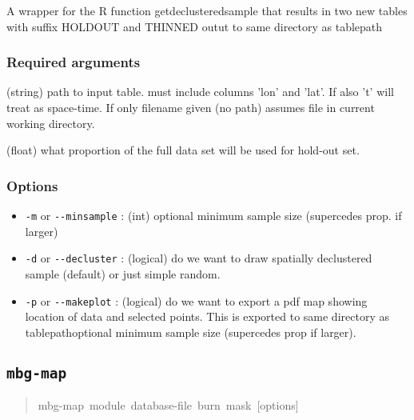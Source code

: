 A wrapper for the R function getdeclusteredsample that results in two new tables with
suffix HOLDOUT and THINNED outut to same directory as tablepath




\subsubsection{Required arguments%
}
\setcounter{listcnt0}{0}
\begin{list}{.}
{
\setlength{\rightmargin}{\leftmargin}
}

\item (string) path to input table. must include columns 'lon' and 'lat'. If
also 't' will treat as space-time. If only filename given (no path) assumes file
in current working directory.

\item (float) what proportion of the full data set will be used for hold-out set.
\end{list}




\subsubsection{Options%
}
%
\begin{itemize}

\item \texttt{-m} or \texttt{-{}-minsample} : (int) optional minimum sample size (supercedes prop.
if larger)

\item \texttt{-d} or \texttt{-{}-decluster} : (logical) do we want to draw spatially declustered
sample (default) or just simple random.

\item \texttt{-p} or \texttt{-{}-makeplot} : (logical) do we want to export a pdf map showing
location of data and selected points. This is exported to same directory as
tablepathoptional minimum sample size (supercedes prop if larger).

\end{itemize}




\subsection{\texttt{mbg-map}%
}
%
\begin{quote}{\ttfamily \raggedright \noindent
mbg-map~module~database-file~burn~mask~{[}options{]}
}
\end{quote}

